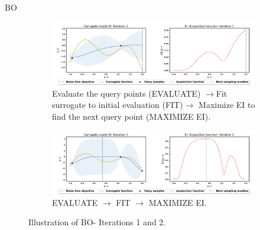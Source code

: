 \documentclass[10pt]{beamer}
\begin{document}
\begin{frame}{BO}
    
    \begin{figure}[!ht]
		\centering
		\begin{subfigure}{1\textwidth}
  			\centering
  			\includegraphics[scale=0.226]{images/BO1.png}
  			\caption{Evaluate the query points (EVALUATE) $\rightarrow$Fit surrogate to initial evaluation (FIT)$\rightarrow$ Maximize EI to find the next query point (MAXIMIZE EI).}
  			\label{fig:BO1}
		\end{subfigure}
		\begin{subfigure}{1\textwidth}
  			\centering
  			\includegraphics[scale=0.226]{images/BO2.png}
  			\caption{EVALUATE $\rightarrow$ FIT $\rightarrow$ MAXIMIZE EI.}
  			\label{fig:BO2}
		\end{subfigure}
\captionsetup{justification=justified}
\caption[Illustration of BO- Iterations 1 to 4.]{Illustration of BO- Iterations 1 and 2.}
\label{fig:BO_steps1}
\end{figure}

\end{frame}
\end{document}
